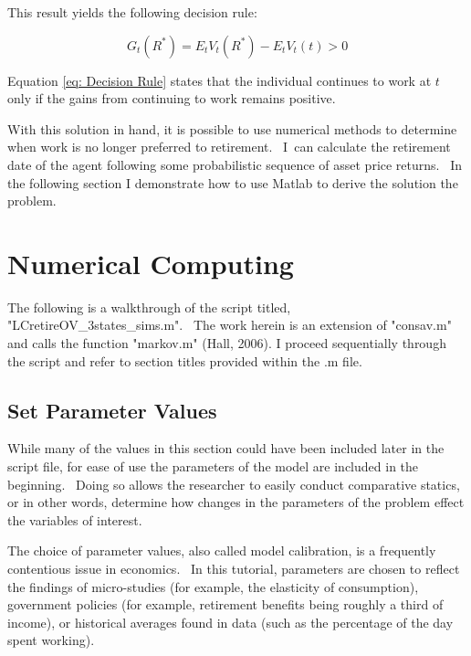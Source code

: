 \documentclass[12pt]{article}
\begin{document}
\noindent%
This result yields the following decision rule:

\begin{equation}
G_{t}(R^{\ast })=E_{t}V_{t}(R^{\ast })-E_{t}V_{t}(t)>0
\label{eq: Decision Rule}
\end{equation}

\noindent%
Equation \ref{eq: Decision Rule} states that the individual continues to
work at $t$ only if the gains from continuing to work remains positive. \ 

With this solution in hand, it is possible to use numerical methods to
determine when work is no longer preferred to retirement. \ I\ can calculate
the retirement date of the agent following some probabilistic sequence of
asset price returns. \ In the following section I demonstrate how to use
Matlab to derive the solution the problem. 

\section{Numerical Computing}

The following is a walkthrough of the script titled,
"LCretireOV\_3states\_sims.m". \ The work herein is an extension of
"consav.m" and calls the function "markov.m" (Hall, 2006). I proceed
sequentially through the script and refer to section titles provided within
the .m file.

\subsection{Set Parameter Values}

While many of the values in this section could have been included later in
the script file, for ease of use the parameters of the model are included in
the beginning. \ Doing so allows the researcher to easily conduct
comparative statics, or in other words, determine how changes in the
parameters of the problem effect the variables of interest.

The choice of parameter values, also called model calibration, is a
frequently contentious issue in economics. \ In this tutorial, parameters
are chosen to reflect the findings of micro-studies (for example, the
elasticity of consumption), government policies (for example, retirement
benefits being roughly a third of income), or historical averages found in
data (such as the percentage of the day spent working). \ 
\end{document}
